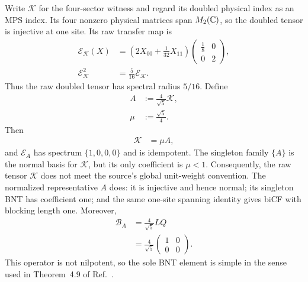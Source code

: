 \documentclass{article}
\begin{document}
Write $\mathcal K$ for the four-sector witness and regard its doubled physical
index as an MPS index. Its four nonzero physical matrices span $M_{2}(\mathbb{C})$, so
the doubled tensor is injective at one site. Its raw transfer map is
\begin{align}
    \mathcal E_{\mathcal K}(X)
        &=
        \left(2X_{00}+\frac1{32}X_{11}\right)
        \begin{pmatrix}
            \frac18&0\\
            0&2
        \end{pmatrix},
    \label{eq:cpgsv17_raw_transfer_map}\\
    \mathcal E_{\mathcal K}^{2}
        &= \frac5{16}\mathcal E_{\mathcal K}.
    \label{eq:cpgsv17_raw_transfer_quasi_idempotence}
\end{align}
Thus the raw doubled tensor has spectral radius $5/16$. Define
\begin{align}
    A
        &:= \frac4{\sqrt5}\mathcal K,
    \label{eq:cpgsv17_normalized_representative}\\
    \mu
        &:= \frac{\sqrt5}{4}.
    \label{eq:cpgsv17_raw_bnt_coefficient}
\end{align}
Then
\begin{align}
    \mathcal K
        &= \mu A,
    \label{eq:cpgsv17_raw_normalized_decomposition}
\end{align}
and $\mathcal E_A$ has spectrum $\{1,0,0,0\}$ and is idempotent. The singleton
family $\{A\}$ is the normal basis for $\mathcal K$, but its only coefficient
is $\mu<1$. Consequently, the raw tensor $\mathcal K$ does not meet the
source's global unit-weight convention. The normalized representative $A$
does: it is injective and hence normal; its singleton BNT has coefficient one;
and the same one-site spanning identity gives biCF with blocking length one.
Moreover,
\begin{align}
    \mathcal B_A
        &= \frac4{\sqrt5}LQ
    \label{eq:cpgsv17_normalized_physical_transfer_scaled}\\
        &= \frac4{\sqrt5}
        \begin{pmatrix}
            1&0\\
            0&0
        \end{pmatrix}.
    \label{eq:cpgsv17_normalized_physical_transfer_matrix}
\end{align}
This operator is not nilpotent, so the sole BNT element is simple in the sense
used in Theorem~4.9 of Ref.~\cite{Cirac2016MPDO_arXiv}.
\end{document}
